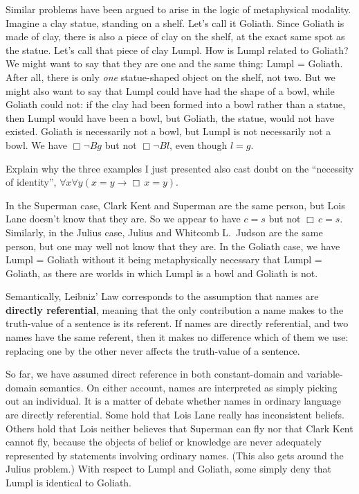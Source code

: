 Similar problems have been argued to arise in the logic of metaphysical
modality. Imagine a clay statue, standing on a shelf. Let's call it
Goliath. Since Goliath is made of clay, there is also a piece of clay on the
shelf, at the exact same spot as the statue. Let's call that piece of clay
Lumpl. How is Lumpl related to Goliath? We might want to say that they are one
and the same thing: Lumpl = Goliath. After all, there is only \emph{one}
statue-shaped object on the shelf, not two. But we might also want to say that
Lumpl could have had the shape of a bowl, while Goliath could not: if the clay
had been formed into a bowl rather than a statue, then Lumpl would have been a
bowl, but Goliath, the statue, would not have existed. Goliath is necessarily
not a bowl, but Lumpl is not necessarily not a bowl. We have $\Box \neg Bg$ but
not $\Box \neg Bl$, even though $l\!=\!g$.

\begin{exercise}
  Explain why the three examples I just presented also cast doubt on the
  ``necessity of identity'', $\forall x\forall y(x\!=\!y \to \Box\, x\!=\!y)$.
\end{exercise}
\begin{solution}
  In the Superman case, Clark Kent and Superman are the same person, but Lois
  Lane doesn't know that they are. So we appear to have $c\!=\!s$ but not
  $\Box\, c\!=\!s$. Similarly, in the Julius case, Julius and Whitcomb L.\ Judson
  are the same person, but one may well not know that they are. In the Goliath
  case, we have Lumpl = Goliath without it being metaphysically necessary that
  Lumpl = Goliath, as there are worlds in which Lumpl is a bowl and Goliath is
  not.
\end{solution}

Semantically, Leibniz' Law corresponds to the assumption that names are
\textbf{directly referential}, meaning that the only contribution a name makes
to the truth-value of a sentence is its referent. If names are directly
referential, and two names have the same referent, then it makes no difference
which of them we use: replacing one by the other never affects the truth-value
of a sentence.

So far, we have assumed direct reference in both constant-domain and
variable-domain semantics. On either account, names are interpreted as simply
picking out an individual. It is a matter of debate whether names in ordinary
language are directly referential. Some hold that Lois Lane really has
inconsistent beliefs. Others hold that Lois neither believes that Superman can
fly nor that Clark Kent cannot fly, because the objects of belief or knowledge
are never adequately represented by statements involving ordinary names. (This
also gets around the Julius problem.) With respect to Lumpl and Goliath, some
simply deny that Lumpl is identical to Goliath.

